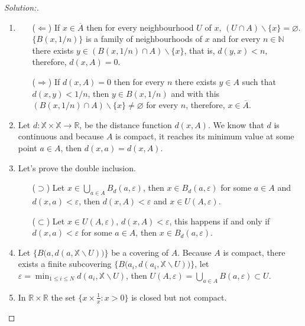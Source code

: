 \documentclass[a4paper,12pt, reqno]{article}
\theoremstyle{definition}
\newenvironment{solution}{\begin{proof}[Solution:]}{\end{proof}}
\newcommand{\R}{\mathbb{R}}
\newcommand{\N}{\mathbb{N}}
\newcommand{\X}{\mathbb{X}}
\begin{document}
\begin{solution}
  \begin{enumerate}[label=(\alph*)]

    \item\hfill
    
    \begin{itemize}
      \item[($\Longleftarrow$)] If $x\in \overline{A}$ then for every neighbourhood $U$ of $x$, $(U\cap A)\backslash\{ x \}=\varnothing$. $\{ B(x,1/n) \}$ is a family of neighbourhoods of $x$ and for every $n\in\N$ there exists $y\in(B(x,1/n)\cap A)\backslash\{ x \}$, that is, $d(y,x)<n$, therefore, $d(x,A)=0$.
      \item[($\Longrightarrow$)] If $d(x,A)=0$ then for every $n$ there exists $y\in A$ such that $d(x,y)<1/n$, then $y\in B(x,1/n)$ and with this $(B(x,1/n)\cap A)\backslash\{ x \}\neq \varnothing$ for every $n$, therefore, $x\in \overline{A}$.
    \end{itemize}
    \item Let $d:\X\times\X\to\R$, be the distance function $d(x,A)$. We know that $d$ is continuous and because $A$ is compact, it reaches its minimum value at some point $a\in A$, then $d(x,a) = d(x,A)$.
    \item Let's prove the double inclusion.
    \begin{itemize}
      \item[($\supset$)] Let $x\in\bigcup_{a\in A}B_{d}(a,\varepsilon)$, then $x\in B_{d}(a,\varepsilon)$ for some $a\in A$ and $d(x,a)<\varepsilon$, then $d(x,A)<\varepsilon$ and $x\in U(A,\varepsilon)$.
      \item[($\subset$)] Let $x\in U(A,\varepsilon)$, $d(x,A)<\varepsilon$, this happens if and only if $d(x,a)<\varepsilon$ for some $a\in A$, then $x\in B_{d}(a,\varepsilon)$.
    \end{itemize}
    \item Let $\big\{ B\big(a,d(a,\X\backslash U)\big) \big\}$ be a covering of $A$. Because $A$ is compact, there exists a finite subcovering $\big\{ B\big(a_{i},d(a_{i},\X\backslash U)\big) \big\}$, let $\varepsilon = \min_{1\leq i\leq N}d(a_{i},\X\backslash U)$, then $U(A,\varepsilon) = \bigcup_{a\in A}B(a,\varepsilon)\subset U$.
    \item In $\R\times\R$ the set $\{ x\times \frac{1}{x} : x>0 \}$ is closed but not compact.
  \end{enumerate}
\end{solution}
\end{document}
